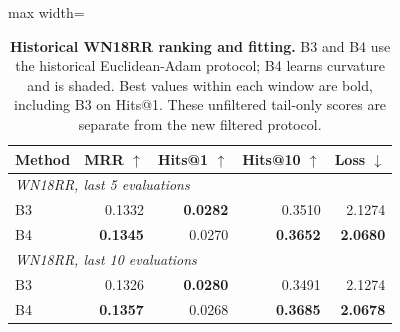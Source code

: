 \begin{table}[t]
\centering
\caption{\textbf{Historical WN18RR ranking and fitting.} B3 and B4 use the historical Euclidean-Adam protocol; B4 learns curvature and is shaded. Best values within each window are bold, including B3 on Hits@1. These unfiltered tail-only scores are separate from the new filtered protocol.}
\label{tab:kg-main}
\footnotesize\setlength{\tabcolsep}{4.2pt}\renewcommand{\arraystretch}{1.12}
\begin{adjustbox}{max width=\linewidth}
\begin{tabular}{lrrrr}
\toprule
Method & MRR $\uparrow$ & Hits@1 $\uparrow$ & Hits@10 $\uparrow$ & Loss $\downarrow$ \\
\midrule
\multicolumn{5}{l}{\textit{WN18RR, last 5 evaluations}} \\
B3 & 0.1332 & \textbf{0.0282} & 0.3510 & 2.1274 \\
\rowcolor{oursbg}
B4 & \textbf{0.1345} & 0.0270 & \textbf{0.3652} & \textbf{2.0680} \\
\multicolumn{5}{l}{\textit{WN18RR, last 10 evaluations}} \\
B3 & 0.1326 & \textbf{0.0280} & 0.3491 & 2.1274 \\
\rowcolor{oursbg}
B4 & \textbf{0.1357} & 0.0268 & \textbf{0.3685} & \textbf{2.0678} \\
\bottomrule
\end{tabular}
\end{adjustbox}
\end{table}
